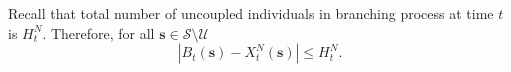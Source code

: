 \documentclass{article}
\theoremstyle{definition}
\newcommand{\abs}[1]{\left\lvert{#1}\right\rvert}
\begin{document}


    
    
    





Recall that total number of uncoupled individuals in branching process at time $t$ is $H^N_t$. Therefore, for all $\bm{s}\in \mathcal S \setminus  \mathcal U$
 \begin{equation}\abs{{{B}}_t(\bm{s}) - {{X}}^N_t(\bm{s})}  \le H^N_t. \label{diff_begin}\end{equation}
\end{document}
